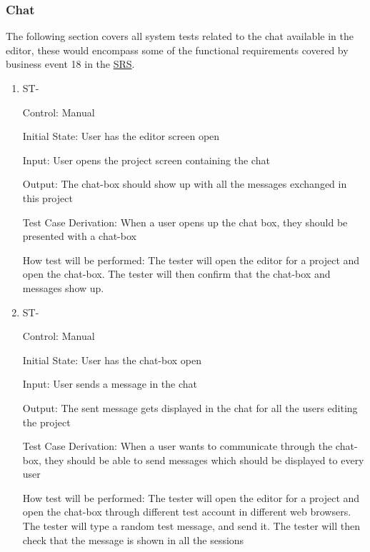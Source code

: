 \documentclass[12pt, titlepage]{article}
\newcounter{TESTID}
\newcommand\TESTNUM{\stepcounter{TESTID}\theTESTID}
\begin{document}
	\subsubsection{Chat}
	
	The following section covers all system tests related to the chat available in the editor, these would encompass some of the functional requirements covered by business event 18 in the \href{https://github.com/RutheniumVI/UnderTree/blob/main/docs/SRS/SRS.pdf}{SRS}.
	
	\begin{enumerate}
		\item{ST-\TESTNUM\\}
		
		Control: Manual
		
		Initial State: User has the editor screen open
		
		Input: User opens the project screen containing the chat
		
		Output: The chat-box should show up with all the messages exchanged in this project
		
		Test Case Derivation: When a user opens up the chat box, they should be presented with a chat-box
		
		How test will be performed: The tester will open the editor for a project and open the chat-box. The tester will then confirm that the chat-box and messages show up.
		
		\item{ST-\TESTNUM\\}
		
		Control: Manual
		
		Initial State: User has the chat-box open
		
		Input: User sends a message in the chat
		
		Output: The sent message gets displayed in the chat for all the users editing the project
		
		Test Case Derivation: When a user wants to communicate through the chat-box, they should be able to send messages which should be displayed to every user
		
		How test will be performed: The tester will open the editor for a project and open the chat-box through different test account in different web browsers. The tester will type a random test message, and send it. The tester will then check that the message is shown in all the sessions
		
	\end{enumerate}
	
\end{document}
